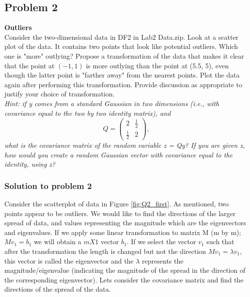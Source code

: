 \documentclass[12pt]{article}%
\begin{document}

\subsection{Problem 2}

\textbf{Outliers}\\

Consider the two-dimensional data in DF2 in Lab2 Data.zip. Look at a scatter plot of the data. It contains two points that look like potential outliers. Which one is "more" outlying? Propose a transformation of the data that makes it clear that the point at $(-1, 1)$ is more outlying than the point at (5.5, 5), even though the latter point is "farther away" from the nearest points. Plot the data again after performing this transformation. Provide discussion as appropriate to justify your choice of transformation.\\

\noindent\textit{Hint: if y comes from a standard Gaussian in two dimensions (i.e., with covariance equal to the two by two identity matrix), and
\begin{equation*}
    Q = \begin{pmatrix}2 & \frac{1}{2}\\\frac{1}{2} & 2\end{pmatrix},
\end{equation*}
what is the covariance matrix of the random variable z = Qy? If you are given z, how would you create a random Gaussian vector with covariance equal to the identity, using z?}\\

\subsubsection{Solution to problem 2}
 
Consider the scatterplot of data in Figure \ref{fig:Q2_first}. As mentioned, two points appear to be outliers. We would like to find the directions of the larger spread of data, and values representing the magnitude \textemdash which are the eigenvectors and eigenvalues. If we apply some linear transformation to matrix M (m by m); $Mv_1 = b_1$ we will obtain a $m X 1$ vector $b_1$. If we select the vector $v_1$ such that after the transformation the length is changed but not the direction $Mv_1 = \lambda v_1$, this vector is called the eigenvector and the $\lambda$ represents the magnitude/eigenvalue (indicating the magnitude of the spread in the direction of the corresponding eigenvector). Lets consider the covariance matrix and find the directions of the spread of the data.
 
\end{document}
